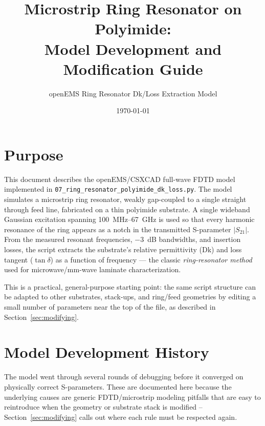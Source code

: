 \documentclass[11pt]{article}
\title{Microstrip Ring Resonator on Polyimide:\\
Model Development and Modification Guide}
\author{openEMS Ring Resonator Dk/Loss Extraction Model}
\date{\today}
\begin{document}
\maketitle
\tableofcontents

\section{Purpose}

This document describes the openEMS/CSXCAD full-wave FDTD model implemented
in \texttt{07\_ring\_resonator\_polyimide\_dk\_loss.py}. The model simulates a
microstrip ring resonator, weakly gap-coupled to a single straight through
feed line, fabricated on a thin polyimide substrate. A single wideband
Gaussian excitation spanning 100~MHz--67~GHz is used so that every harmonic
resonance of the ring appears as a notch in the transmitted S-parameter
\(|S_{21}|\). From the measured resonant frequencies, $-3$~dB bandwidths, and
insertion losses, the script extracts the substrate's relative permittivity
(Dk) and loss tangent ($\tan\delta$) as a function of frequency --- the
classic \emph{ring-resonator method} used for microwave/mm-wave laminate
characterization.

This is a practical, general-purpose starting point: the same script
structure can be adapted to other substrates, stack-ups, and ring/feed
geometries by editing a small number of parameters near the top of the file,
as described in Section~\ref{sec:modifying}.

\section{Model Development History}

The model went through several rounds of debugging before it converged on
physically correct S-parameters. These are documented here because the
underlying causes are generic FDTD/microstrip modeling pitfalls that are
easy to reintroduce when the geometry or substrate stack is modified --
Section~\ref{sec:modifying} calls out where each rule must be respected
again.
\end{document}

